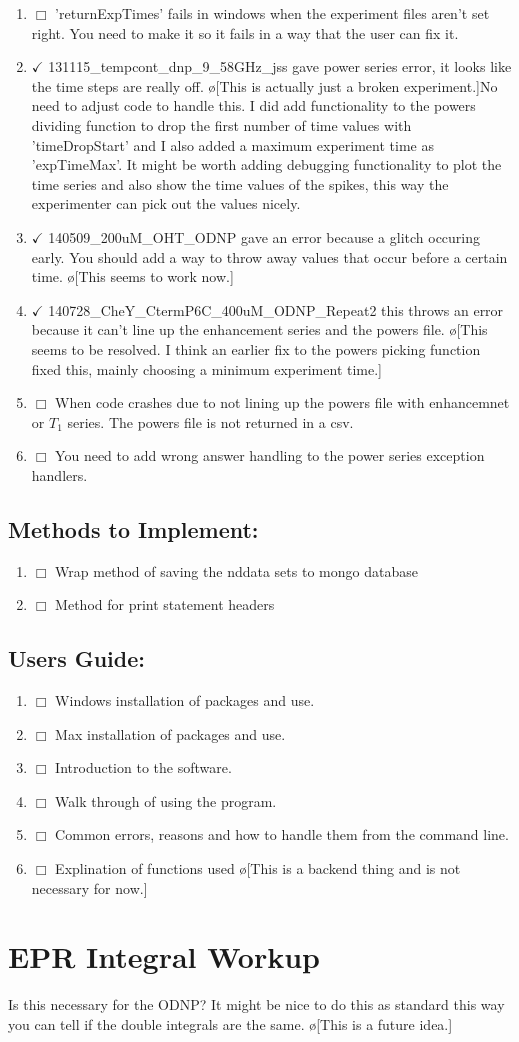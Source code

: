 \documentclass[10pt]{book}
\begin{document}
\begin{enumerate}
    \item $\Box$ 'returnExpTimes' fails in windows when the experiment files aren't set right. You need to make it so it fails in a way that the user can fix it.
    \item $\checkmark$ 131115_tempcont_dnp_9_58GHz_jss gave power series error, it looks like the time steps are really off. \o[This is actually just a broken experiment.]{No need to adjust code to handle this. I did add functionality to the powers dividing function to drop the first number of time values with 'timeDropStart' and I also added a maximum experiment time as 'expTimeMax'. It might be worth adding debugging functionality to plot the time series and also show the time values of the spikes, this way the experimenter can pick out the values nicely.}
    \item $\checkmark$ 140509_200uM_OHT_ODNP gave an error because a glitch occuring early. You should add a way to throw away values that occur before a certain time. \o[This seems to work now.]{}
    \item $\checkmark$ 140728_CheY_CtermP6C_400uM_ODNP_Repeat2 this throws an error because it can't line up the enhancement series and the powers file. \o[This seems to be resolved. I think an earlier fix to the powers picking function fixed this, mainly choosing a minimum experiment time.]{}
    \item $\Box$ When code crashes due to not lining up the powers file with enhancemnet or $T_1$ series. The powers file is not returned in a csv.
    \item $\Box$ You need to add wrong answer handling to the power series exception handlers.
\end{enumerate}
\section{Methods to Implement:}
\begin{enumerate}
    \item $\Box$ Wrap method of saving the nddata sets to mongo database
    \item $\Box$ Method for print statement headers
\end{enumerate}
\section{Users Guide:}
\begin{enumerate}
    \item $\Box$ Windows installation of packages and use.
    \item $\Box$ Max installation of packages and use.
    \item $\Box$ Introduction to the software.
    \item $\Box$ Walk through of using the program.
    \item $\Box$ Common errors, reasons and how to handle them from the command line.
    \item $\Box$ Explination of functions used \o[This is a backend thing and is not necessary for now.]{}
\end{enumerate}
\chapter{EPR Integral Workup}
Is this necessary for the ODNP? It might be nice to do this as standard this way you can tell if the double integrals are the same. \o[This is a future idea.]
\end{document}
